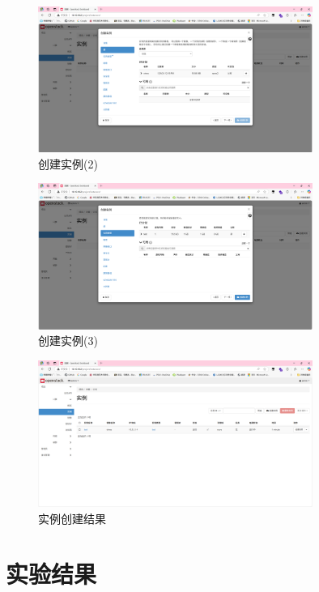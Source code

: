 \documentclass{article}
\begin{document}
\begin{figure}[H]
    \centering
    \includegraphics[width=0.8\textwidth]{img/11.2.png}
    \caption{创建实例(2)}
\end{figure}

\begin{figure}[H]
    \centering
    \includegraphics[width=0.8\textwidth]{img/11.3.png}
    \caption{创建实例(3)}
\end{figure}

\begin{figure}[H]
    \centering
    \includegraphics[width=0.8\textwidth]{img/11.4.png}
    \caption{实例创建结果}
\end{figure}


\section{实验结果}
\end{document}
